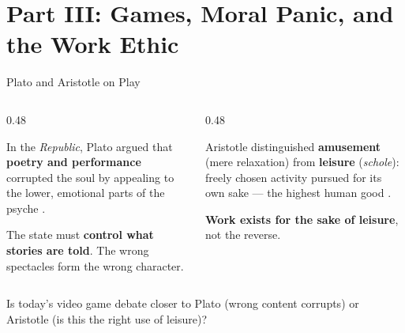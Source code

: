 \documentclass[aspectratio=169,11pt]{beamer}
\begin{document}
\section{Part III: Games, Moral Panic, and the Work Ethic}

\begin{frame}[t]{Plato and Aristotle on Play}
\begin{columns}[T]
\begin{column}{0.48\textwidth}
\begin{objectionbox}
\footnotesize
In the \emph{Republic}, Plato argued that \textbf{poetry and performance} corrupted the soul by appealing to the lower, emotional parts of the psyche \parencite{plato_republic}.

\vspace{0.1cm}
The state must \textbf{control what stories are told}. The wrong spectacles form the wrong character.
\end{objectionbox}
\end{column}
\begin{column}{0.48\textwidth}
\begin{probox}
\footnotesize
Aristotle distinguished \textbf{amusement} (mere relaxation) from \textbf{leisure} (\emph{schole}): freely chosen activity pursued for its own sake --- the highest human good \parencite{aristotle_nicomachean}.

\vspace{0.1cm}
\textbf{Work exists for the sake of leisure}, not the reverse.
\end{probox}
\end{column}
\end{columns}

\vspace{0.15cm}
\begin{discussionbox}[Discussion]
\footnotesize
Is today's video game debate closer to Plato (wrong content corrupts) or Aristotle (is this the right use of leisure)?
\end{discussionbox}
\end{frame}
\end{document}
